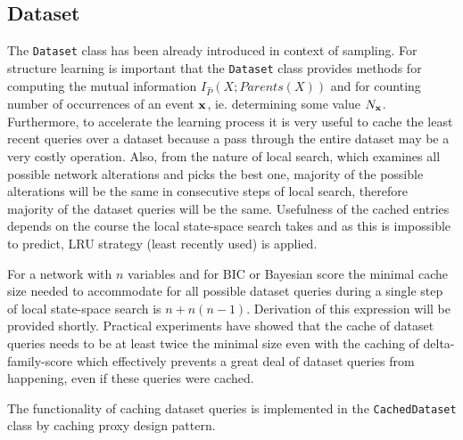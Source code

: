 \documentclass[english,cover]{fitthesis} %
\newcommand{\srccode}[1]{{\tt #1}}         %
\newcommand{\vars}[1]{{\bold{#1}}}         %
\begin{document}
\subsection{Dataset}
The \srccode{Dataset} class has been already introduced in context of sampling. For structure learning is important that the \srccode{Dataset} class provides methods for computing the mutual information $I_{\hat P}(X; Parents(X))$ and for counting number of occurrences of an event $\vars{x}$, ie. determining some value $N_\vars{x}$. Furthermore, to accelerate the learning process it is very useful to cache the least recent queries over a dataset because a pass through the entire dataset may be a very costly operation. Also, from the nature of local search, which examines all possible network alterations and picks the best one, majority of the possible alterations will be the same in consecutive steps of local search, therefore majority of the dataset queries will be the same. Usefulness of the cached entries depends on the course the local state-space search takes and as this is impossible to predict, LRU strategy (least recently used) is applied.

For a network with $n$ variables and for BIC or Bayesian score the minimal cache size needed to accommodate for all possible dataset queries during a single step of local state-space search is $n + n(n-1)$. Derivation of this expression will be provided shortly. Practical experiments have showed that the cache of dataset queries needs to be at least twice the minimal size even with the caching of delta-family-score which effectively prevents a great deal of dataset queries from happening, even if these queries were cached.

The functionality of caching dataset queries is implemented in the \srccode{CachedDataset} class by caching proxy design pattern.
\end{document}
